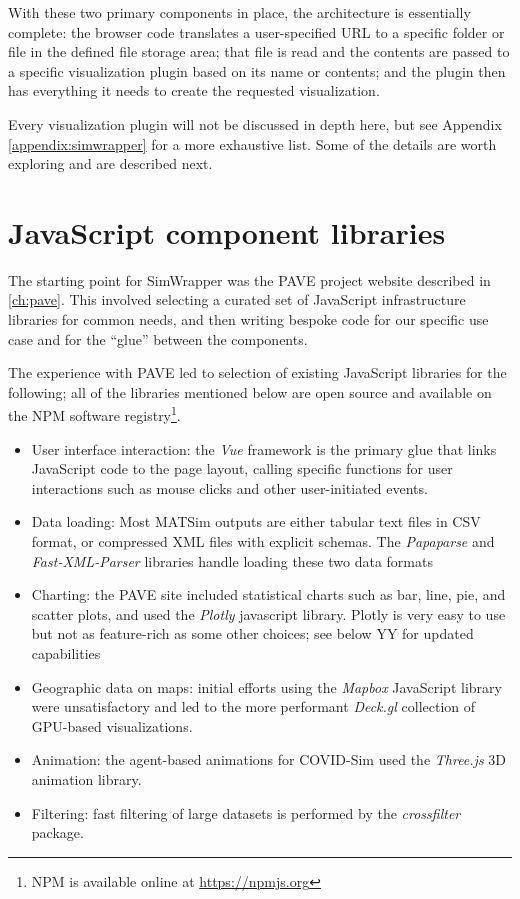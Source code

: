 With these two primary components in place, the architecture is essentially complete: the browser code translates a user-specified URL to a specific folder or file in the defined file storage area; that file is read and the contents are passed to a specific visualization plugin based on its name or contents; and the plugin then has everything it needs to create the requested visualization.

Every visualization plugin will not be discussed in depth here, but see Appendix \ref{appendix:simwrapper} for a more exhaustive list. Some of the details are worth exploring and are described next.


\hypertarget{simwrapper-javascript-libraries}{%
\section{JavaScript component libraries}\label{simwrapper-javascript-libraries}}

The starting point for SimWrapper was the PAVE project website described in \ref{ch:pave}. This involved selecting a curated set of JavaScript infrastructure libraries for common needs, and then writing bespoke code for our specific use case and for the ``glue'' between the components.

The experience with PAVE led to selection of existing JavaScript libraries for the following; all of the libraries mentioned below are open source and available on the NPM software registry\footnote{NPM is available online at \url{https://npmjs.org}}.

\begin{itemize}
\item
  User interface interaction: the \emph{Vue} framework is the primary glue that
  links JavaScript code to the page layout, calling specific functions for user
  interactions such as mouse clicks and other user-initiated events.
\item
  Data loading: Most MATSim outputs are either tabular text files in CSV
  format, or compressed XML files with explicit schemas. The \emph{Papaparse}
  and \emph{Fast-XML-Parser} libraries handle loading these two data formats
\item
  Charting: the PAVE site included statistical charts such as bar, line,
  pie, and scatter plots, and used the \emph{Plotly} javascript library. Plotly
  is very easy to use but not as feature-rich as some other choices; see
  below YY for updated capabilities
\item
  Geographic data on maps: initial efforts using the \emph{Mapbox}
  JavaScript library were unsatisfactory and led to the more performant
  \emph{Deck.gl} collection of \gls{GPU}-based visualizations.
\item
  Animation: the agent-based animations for COVID-Sim used the \emph{Three.js}
  3D animation library.
  \item
  Filtering: fast filtering of large datasets is performed by the \emph{crossfilter} package.
\end{itemize}

